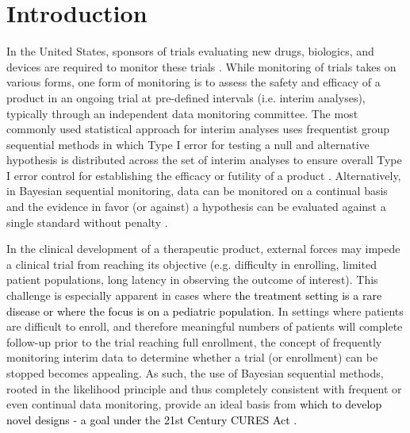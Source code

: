 \documentclass[12pt]{article}
\begin{document}
\section{Introduction}

In the United States, sponsors of trials evaluating new drugs, biologics, and devices are required to monitor these trials \citep{FDA2006}. 
%
While monitoring of trials takes on various forms, one form of monitoring is to assess the safety and efficacy of a product in an ongoing trial at pre-defined intervals (i.e. interim analyses), typically through an independent data monitoring committee. 
%
The most commonly used statistical approach for interim analyses uses frequentist group sequential methods in which Type I error for testing a null and alternative hypothesis is distributed across the set of interim analyses to ensure overall Type I error control for establishing the efficacy or futility of a product \citep{Jennison2000}.  
%
Alternatively, in Bayesian sequential monitoring, data can be monitored on a continual basis and the evidence in favor (or against) a hypothesis can be evaluated against a single standard without penalty \citep{Spiegelhalter1993}. %

In the clinical development of a therapeutic product, external forces may impede a clinical trial from reaching its objective (e.g. difficulty in enrolling, limited patient populations, long latency in observing the outcome of interest). 
%
This challenge is especially apparent in cases where \textcolor{black}{the treatment setting is a rare disease or where the focus is on a pediatric population}.
%
In settings where patients are difficult to enroll, and therefore meaningful numbers of patients will complete follow-up prior to the trial reaching full enrollment, the concept of frequently monitoring interim data to determine whether a trial (or enrollment) can be stopped becomes appealing. 
%
As such, the use of Bayesian sequential methods, rooted in the likelihood principle and thus completely consistent with frequent or even continual data monitoring, provide an ideal basis from \textcolor{black}{which to develop novel designs - a goal under the 21st Century CURES Act \citep{USCongress2016}.}
%
\end{document}
